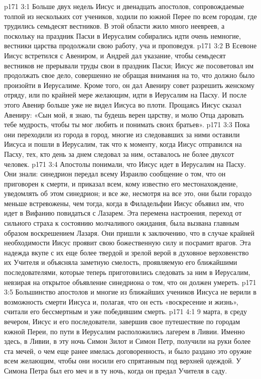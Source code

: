 \vs p171 3:1 Больше двух недель Иисус и двенадцать апостолов, сопровождаемые толпой из нескольких сот учеников, ходили по южной Перее по всем городам, где трудились семьдесят вестников. В этой области жило много неевреев, а поскольку на праздник Пасхи в Иерусалим собирались идти очень немногие, вестники царства продолжали свою работу, уча и проповедуя.
\vs p171 3:2 В Есевоне Иисус встретился с Авениром, и Андрей дал указание, чтобы семьдесят вестников не прерывали труды свои в праздник Пасхи; Иисус же посоветовал им продолжать свое дело, совершенно не обращая внимания на то, что должно было произойти в Иерусалиме. Кроме того, он дал Авениру совет разрешить женскому отряду, или по крайней мере желающим, идти в Иерусалим на Пасху. И после этого Авенир больше уже не видел Иисуса во плоти. Прощаясь Иисус сказал Авениру: «Сын мой, я знаю, ты будешь верен царству, и молю Отца даровать тебе мудрость, чтобы ты мог любить и понимать своих братьев».
\vs p171 3:3 Пока они переходили из города в город, многие из следовавших за ними оставили Иисуса и пошли в Иерусалим, так что к моменту, когда Иисус отправился на Пасху, тех, кто день за днем следовал за ним, оставалось не более двухсот человек.
\vs p171 3:4 Апостолы понимали, что Иисус идет в Иерусалим на Пасху. Они знали: синедрион передал всему Израилю сообщение о том, что он приговорен к смерти, и приказал всем, кому известно его местонахождение, уведомлять об этом синедрион; и все же, несмотря на все это, они были гораздо меньше встревожены, чем тогда, когда в Филадельфии Иисус объявил им, что идет в Вифанию повидаться с Лазарем. Эта перемена настроения, переход от сильного страха к состоянию молчаливого ожидания, была вызвана главным образом воскрешением Лазаря. Они пришли к заключению, что в случае крайней необходимости Иисус проявит свою божественную силу и посрамит врагов. Эта надежда вкупе с их еще более твердой и зрелой верой в духовное верховенство их Учителя и объясняла заметную смелость, проявляемую его ближайшими последователями, которые теперь приготовились следовать за ним в Иерусалим, невзирая на открытое объявление синедриона о том, что он должен умереть.
\vs p171 3:5 Большинство апостолов и многие из ближайших учеников Иисуса не верили в возможность смерти Иисуса и, полагая, что он есть «воскресение и жизнь», считали его бессмертным и уже победившим смерть.
\vs p171 4:1 9 марта, в среду вечером, Иисус и его последователи, завершив свое путешествие по городам южной Переи, по пути в Иерусалим расположились лагерем в Ливии. Именно здесь, в Ливии, в эту ночь Симон Зилот и Симон Петр, получили на руки более ста мечей, о чем еще ранее имелась договоренность, и было раздано это оружие всем желающим, чтобы они носили его спрятанным под верхней одеждой. У Симона Петра был его меч и в ту ночь, когда он предал Учителя в саду.

